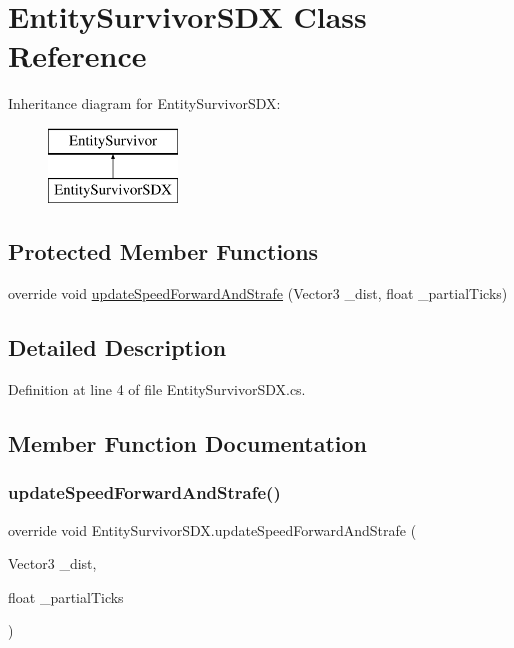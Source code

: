 \hypertarget{class_entity_survivor_s_d_x}{}\section{Entity\+Survivor\+S\+DX Class Reference}
\label{class_entity_survivor_s_d_x}
Inheritance diagram for Entity\+Survivor\+S\+DX\+:\begin{figure}[H]
\begin{center}
\leavevmode
\includegraphics[height=2.000000cm]{de/d89/class_entity_survivor_s_d_x}
\end{center}
\end{figure}
\subsection*{Protected Member Functions}
\begin{DoxyCompactItemize}
\item 
override void \mbox{\hyperlink{class_entity_survivor_s_d_x_a481fbb0edef52ac83037ed017688ab6d}{update\+Speed\+Forward\+And\+Strafe}} (Vector3 \+\_\+dist, float \+\_\+partial\+Ticks)
\end{DoxyCompactItemize}


\subsection{Detailed Description}


Definition at line 4 of file Entity\+Survivor\+S\+D\+X.\+cs.



\subsection{Member Function Documentation}
\mbox{\label{class_entity_survivor_s_d_x_a481fbb0edef52ac83037ed017688ab6d}} 
\subsubsection{\texorpdfstring{updateSpeedForwardAndStrafe()}{updateSpeedForwardAndStrafe()}}
{\footnotesize\ttfamily override void Entity\+Survivor\+S\+D\+X.\+update\+Speed\+Forward\+And\+Strafe (\begin{DoxyParamCaption}\item[{Vector3}]{\+\_\+dist,  }\item[{float}]{\+\_\+partial\+Ticks }\end{DoxyParamCaption})\hspace{0.3cm}{\ttfamily [protected]}}



